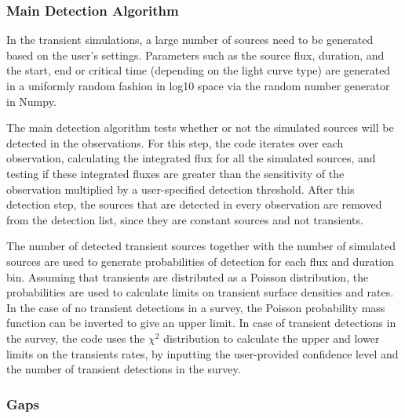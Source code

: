 \documentclass[12pt]{article}
\begin{document}
\subsubsection{Main Detection Algorithm}

In the transient simulations, a large number of sources need to be generated based on the user's settings. Parameters such as the source flux, duration, and the start, end or critical time (depending on the light curve type) are generated in a uniformly random fashion in log10 space via the random number generator in Numpy. 

The main detection algorithm tests whether or not the simulated sources will be detected in the observations. For this step, the code iterates over each observation, calculating the integrated flux for all the simulated sources, and testing if these integrated fluxes are greater than the sensitivity of the observation multiplied by a user-specified detection threshold. After this detection step, the sources that are detected in every observation are removed from the detection list, since they are constant sources and not transients. 

The number of detected transient sources together with the number of simulated sources are used to generate probabilities of detection for each flux and duration bin. Assuming that transients are distributed as a Poisson distribution, the probabilities are used to calculate limits on transient surface densities and rates. In the case of no transient detections in a survey, the Poisson probability mass function can be inverted to give an upper limit. In case of transient detections in the survey, the code uses the $\chi^2$ distribution \citep[for a review see][]{12005udd3.inbook.....JKK} to calculate the upper and lower limits on the transients rates, by inputting the user-provided confidence level and the number of transient detections in the survey. 



\subsubsection{Gaps}
\end{document}
